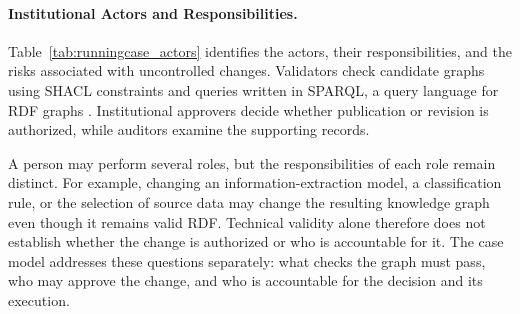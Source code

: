 \documentclass[journal]{IEEEtran}
\begin{document}
\paragraph{Institutional Actors and Responsibilities.}

Table~\ref{tab:runningcase_actors} identifies the actors,
their responsibilities, and the risks associated with
uncontrolled changes. Validators check candidate graphs using SHACL constraints
\cite{Knublauch2017SHACL} and queries written in SPARQL,
a query language for RDF graphs \cite{Harris2013SPARQL}.
Institutional approvers decide whether publication or revision
is authorized, while auditors examine the supporting records.

A person may perform several roles, but the responsibilities
of each role remain distinct. For example, changing an
information-extraction model, a classification rule, or the
selection of source data may change the resulting knowledge
graph even though it remains valid RDF. Technical validity
alone therefore does not establish whether the change is
authorized or who is accountable for it. The case model
addresses these questions separately: what checks the graph
must pass, who may approve the change, and who is accountable
for the decision and its execution.
\end{document}
